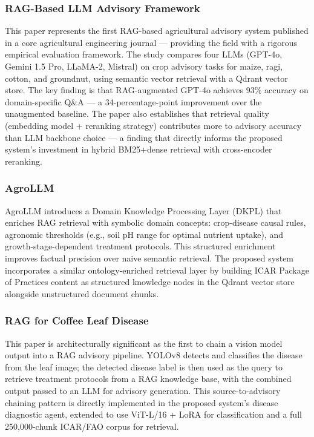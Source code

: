 \documentclass[12pt,a4paper]{article}
\begin{document}
\subsubsection{RAG-Based LLM Advisory Framework \cite{ragMaize2026}}
This paper represents the first RAG-based agricultural advisory system published in a core agricultural engineering journal --- providing the field with a rigorous empirical evaluation framework. The study compares four LLMs (GPT-4o, Gemini 1.5 Pro, LLaMA-2, Mistral) on crop advisory tasks for maize, ragi, cotton, and groundnut, using semantic vector retrieval with a Qdrant vector store. The key finding is that RAG-augmented GPT-4o achieves 93\% accuracy on domain-specific Q\&A --- a 34-percentage-point improvement over the unaugmented baseline. The paper also establishes that retrieval quality (embedding model + reranking strategy) contributes more to advisory accuracy than LLM backbone choice --- a finding that directly informs the proposed system's investment in hybrid BM25+dense retrieval with cross-encoder reranking.

\subsubsection{AgroLLM \cite{agrollm2025}}
AgroLLM introduces a Domain Knowledge Processing Layer (DKPL) that enriches RAG retrieval with symbolic domain concepts: crop-disease causal rules, agronomic thresholds (e.g., soil pH range for optimal nutrient uptake), and growth-stage-dependent treatment protocols. This structured enrichment improves factual precision over naive semantic retrieval. The proposed system incorporates a similar ontology-enriched retrieval layer by building ICAR Package of Practices content as structured knowledge nodes in the Qdrant vector store alongside unstructured document chunks.

\subsubsection{RAG for Coffee Leaf Disease \cite{overcoming2024}}
This paper is architecturally significant as the first to chain a vision model output into a RAG advisory pipeline. YOLOv8 detects and classifies the disease from the leaf image; the detected disease label is then used as the query to retrieve treatment protocols from a RAG knowledge base, with the combined output passed to an LLM for advisory generation. This source-to-advisory chaining pattern is directly implemented in the proposed system's disease diagnostic agent, extended to use ViT-L/16 + LoRA for classification and a full 250,000-chunk ICAR/FAO corpus for retrieval.
\end{document}
